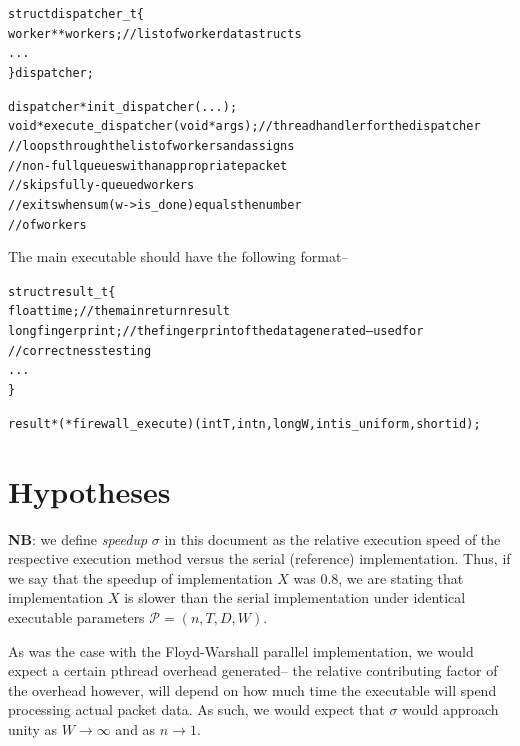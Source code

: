 \documentclass{article}
\newcommand{\ti}[1]{\emph{#1}}
\newcommand{\tb}[1]{\textbf{#1}}
\newcommand{\cpart}[1]{\newblock{\LARGE {\\\\#1}}}
\newcommand{\code}[1]{\texttt{$\text{#1}$}}
\begin{document}
\begin{alltt}

struct dispatcher_t \{
  worker **workers;                       // list of worker data structs
  ...
\} dispatcher;

dispatcher *init_dispatcher(...);
void *execute_dispatcher(void *args);     // thread handler for the dispatcher
                                          // loops through the list of workers and assigns
                                          //   non-full queues with an appropriate packet
                                          // skips fully-queued workers
                                          // exits when sum(w->is_done) equals the number
                                          //   of workers

\end{alltt}

\cpart{Executable}

The main executable should have the following format--

\begin{alltt}

struct result_t \{
  float time;                             // the main return result
  long fingerprint;                       // the fingerprint of the data generated -- used for
                                          //   correctness testing
  ...
\}

result *(*firewall_execute) (int T, int n, long W, int is_uniform, short id);

\end{alltt}

\section{Hypotheses}

\tb{NB}: we define \ti{speedup} $\sigma$ in this document as the relative execution speed of the respective execution method versus the serial (reference) 
implementation. Thus, if we say that the speedup of implementation $X$ was $0.8$, we are stating that implementation $X$ is slower than the serial implementation 
under identical executable parameters $\mathcal{P} = (n, T, D, W)$.

\cpart{Parallel Overhead}

As was the case with the Floyd-Warshall parallel implementation, we would expect a certain \code{pthread} overhead generated-- the relative contributing factor of 
the overhead however, will depend on how much time the executable will spend processing actual packet data. As such, we would expect that $\sigma$ would approach 
unity as $W \to \infty$ and as $n \to 1$.
\end{document}
